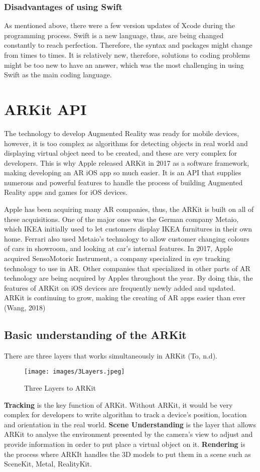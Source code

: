 	\subsubsection{Disadvantages of using Swift}
As mentioned above, there were a few version updates of Xcode during the programming process. Swift is a new language, thus, are being changed constantly to reach perfection. Therefore, the syntax and packages might change from times to times. It is relatively new, therefore, solutions to coding problems might be too new to have an answer, which was the most challenging in using Swift as the main coding language. 

\section{ARKit API}
The technology to develop Augmented Reality was ready for mobile devices, however, it is too complex as algorithms for detecting objects in real world and displaying virtual object need to be created, and these are very complex for developers. This is why Apple released ARKit in 2017 as a software framework, making developing an AR iOS app so much easier. It is an API that supplies numerous and powerful features to handle the process of building Augmented Reality apps and games for iOS devices. 

Apple has been acquiring many AR companies, thus, the ARKit is built on all of these acquisitions. One of the major ones was the German company Metaio, which IKEA initially used to let customers display IKEA furnitures in their own home. Ferrari also used Metaio’s technology to allow customer changing colours of cars in showroom, and looking at car’s internal features. In 2017, Apple acquired SensoMotoric Instrument, a company specialized in eye tracking technology to use in AR. Other companies that specialized in other parts of AR technology are being acquired by Apples throughout the year. By doing this, the features of ARKit on iOS devices are frequently newly added and updated. ARKit is continuing to grow, making the creating of AR apps easier than ever (Wang, 2018)

\subsection{Basic understanding of the ARKit}
There are three layers that works simultaneously in ARKit (To, n.d). 
\begin{figure}[!htp]
	\centering
	\texttt{[image: images/3Layers.jpeg]}
	\caption{Three Layers to ARKit}
	\label{3Layers}
\end{figure}
\textbf{Tracking} is the key function of ARKit. Without ARKit, it would be very complex for developers to write algorithm to track a device’s position, location and orientation in the real world.
\textbf{Scene Understanding} is the layer that allows ARKit to analyse the environment presented by the camera’s view to adjust and provide information in order to put place a virtual object on it. 
\textbf{Rendering} is the process where ARKIt handles the 3D models to put them in a scene such as SceneKit, Metal, RealityKit.

